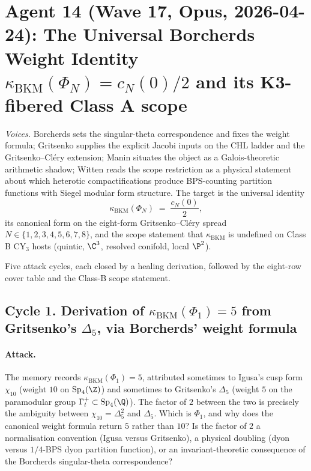 \section*{Agent 14 (Wave 17, Opus, 2026-04-24):
  The Universal Borcherds Weight Identity
  $\kappa_{\mathrm{BKM}}(\Phi_N) = c_N(0)/2$ and its K3-fibered
  Class A scope}
\label{sec:agent14-universal-borcherds-weight}

\emph{Voices.} Borcherds sets the singular-theta correspondence and
fixes the weight formula; Gritsenko supplies the explicit Jacobi
inputs on the CHL ladder and the Gritsenko--Cl\'ery extension;
Manin situates the object as a Galois-theoretic arithmetic shadow;
Witten reads the scope restriction as a physical statement about
which heterotic compactifications produce BPS-counting partition
functions with Siegel modular form structure. The target is the
universal identity
\[
  \kappa_{\mathrm{BKM}}(\Phi_N) \;=\; \frac{c_N(0)}{2},
\]
its canonical form on the eight-form Gritsenko--Cl\'ery spread
$N \in \{1, 2, 3, 4, 5, 6, 7, 8\}$, and the scope statement that
$\kappa_{\mathrm{BKM}}$ is undefined on Class B CY$_3$ hosts
(quintic, $\C^3$, resolved conifold, local $\P^2$).

Five attack cycles, each closed by a healing derivation, followed
by the eight-row cover table and the Class-B scope statement.

\subsection*{Cycle 1. Derivation of $\kappa_{\mathrm{BKM}}(\Phi_1)
  = 5$ from Gritsenko's $\Delta_5$, via Borcherds' weight formula}

\paragraph{Attack.} The memory records $\kappa_{\mathrm{BKM}}
(\Phi_1) = 5$, attributed sometimes to Igusa's cusp form
$\chi_{10}$ (weight $10$ on $\mathrm{Sp}_4(\Z)$) and sometimes
to Gritsenko's $\Delta_5$ (weight $5$ on the paramodular group
$\Gamma^+_t \subset \mathrm{Sp}_4(\Q)$). The factor of $2$ between
the two is precisely the ambiguity between $\chi_{10} = \Delta_5^2$
and $\Delta_5$. Which is $\Phi_1$, and why does the canonical
weight formula return $5$ rather than $10$? Is the factor of $2$
a normalisation convention (Igusa versus Gritsenko), a physical
doubling (dyon versus $1/4$-BPS dyon partition function), or an
invariant-theoretic consequence of the Borcherds singular-theta
correspondence?

